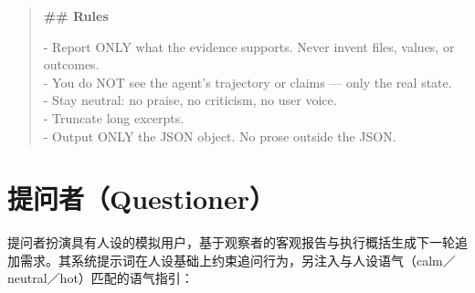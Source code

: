 \begin{quote}
\textbf{\#\# Rules}

- Report ONLY what the evidence supports. Never invent files, values, or outcomes. \\
- You do NOT see the agent's trajectory or claims — only the real state. \\
- Stay neutral: no praise, no criticism, no user voice. \\
- Truncate long excerpts. \\
- Output ONLY the JSON object. No prose outside the JSON.
\end{quote}

\section{提问者（Questioner）}

提问者扮演具有人设的模拟用户，基于观察者的客观报告与执行概括生成下一轮追加需求。其系统提示词在人设基础上约束追问行为，另注入与人设语气（calm／neutral／hot）匹配的语气指引：

